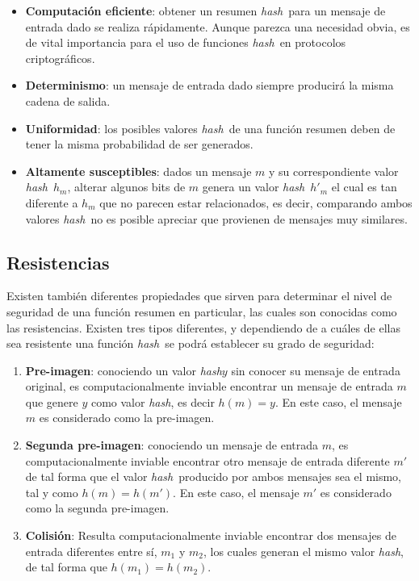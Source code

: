 \documentclass[12pt,spanish,listoffigures,listoftables]{tfgetsinf}
\newcommand{\hash}{\textit{hash}}
\begin{document}
\begin{itemize}

	\item \textbf{Computación eficiente}: obtener un resumen \hash~para un mensaje de entrada dado se realiza rápidamente. Aunque parezca una necesidad obvia, es de vital importancia para el uso de funciones \hash~en protocolos criptográficos.

    \item \textbf{Determinismo}: un mensaje de entrada dado siempre producirá la misma cadena de salida.

    \item \textbf{Uniformidad}: los posibles valores \hash~de una función resumen deben de tener la misma probabilidad de ser generados.

    \item \textbf{Altamente susceptibles}: dados un mensaje $m$ y su correspondiente valor \hash~$h_m$, alterar algunos bits de $m$ genera un valor \hash~$h'_m$ el cual es tan diferente a $h_m$ que no parecen estar relacionados, es decir, comparando ambos valores \hash~no es posible apreciar que provienen de mensajes muy similares.

\end{itemize}

\subsection{Resistencias}

Existen también diferentes propiedades que sirven para determinar el nivel de seguridad de una función resumen en particular, las cuales son conocidas como las resistencias. Existen tres tipos diferentes, y dependiendo de a cuáles de ellas sea resistente una función \hash~se podrá establecer su grado de seguridad:

\begin{enumerate}

	\item \textbf{Pre-imagen}: conociendo un valor \hash $y$ sin conocer su mensaje de entrada original, es computacionalmente inviable encontrar un mensaje de entrada $m$ que genere $y$ como valor \hash, es decir $h(m) = y$. En este caso, el mensaje $m$ es considerado como la pre-imagen.
 
	\item \textbf{Segunda pre-imagen}: conociendo un mensaje de entrada $m$, es computacionalmente inviable encontrar otro mensaje de entrada diferente $m'$ de tal forma que el valor \hash~producido por ambos mensajes sea el mismo, tal y como $h(m) = h(m')$. En este caso, el mensaje $m'$ es considerado como la segunda pre-imagen.

	\item \textbf{Colisión}: Resulta computacionalmente inviable encontrar dos mensajes de entrada diferentes entre sí, $m_1$ y $m_2$, los cuales generan el mismo valor \hash, de tal forma que $h(m_1) = h(m_2)$.

\end{enumerate}
\end{document}
